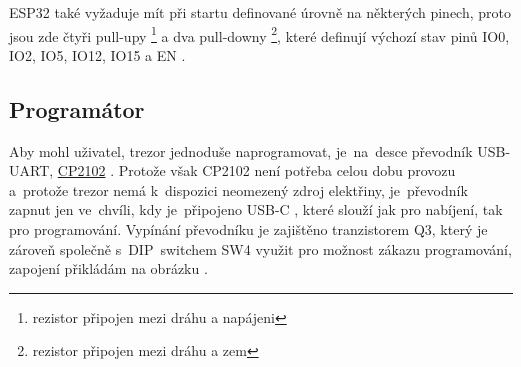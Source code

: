ESP32 také vyžaduje mít při startu definované úrovně na některých pinech, proto jsou zde čtyři pull-upy \footnote{rezistor připojen mezi dráhu a napájeni} 
a dva pull-downy \footnote{rezistor připojen mezi dráhu a zem}, které definují výchozí stav pinů IO0, IO2, IO5, IO12, IO15 a EN \parencite{ESP32}.
\begin{table}[h]
    \centering
    \caption{Popis funkce pinů}
    \label{tab:COMPARATION}
\end{table}

\newpage

\subsection*{Programátor}
Aby mohl uživatel, trezor jednoduše naprogramovat, je~na~desce převodník USB-UART, \href{https://www.silabs.com/documents/public/data-sheets/cp2102n-datasheet.pdf}{CP2102} \parencite{cp2102}.
Protože však CP2102 není potřeba celou dobu provozu a~protože trezor nemá k~dispozici neomezený zdroj elektřiny, je~převodník zapnut jen ve~chvíli, 
kdy je~připojeno USB-C , které slouží jak pro nabíjení, tak pro programování. Vypínání převodníku je zajištěno tranzistorem Q3, který je zároveň společně 
s~DIP~switchem SW4 využit pro možnost zákazu programování, zapojení přikládám na obrázku .

\newpage